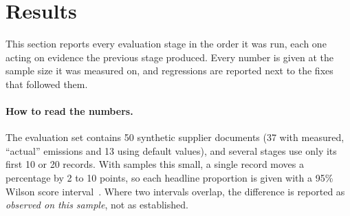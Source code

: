 \section{Results}
\label{sec:results_cbam}

This section reports every evaluation stage in the order it was run, each
one acting on evidence the previous stage produced. Every number is given
at the sample size it was measured on, and regressions are reported next
to the fixes that followed them.

\paragraph{How to read the numbers.} The evaluation set contains 50
synthetic supplier documents (37 with measured, ``actual'' emissions and 13
using default values), and several stages use only its first 10 or 20
records. With samples this small, a single record moves a percentage by 2
to 10 points, so each headline proportion is given with a 95\% Wilson score
interval~\cite{wilson1927}. Where two intervals overlap, the difference is
reported as \textit{observed on this sample}, not as established.

